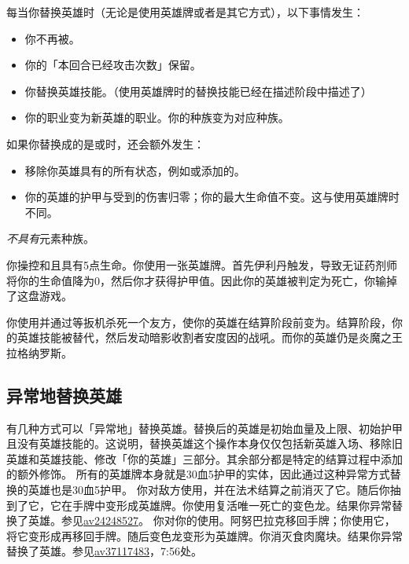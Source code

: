 每当你替换英雄时（无论是使用英雄牌或者是其它方式），以下事情发生：
\begin{itemize}
    \item 你不再被。
    \item 你的「本回合已经攻击次数」保留。
    \item 你替换英雄技能。（使用英雄牌时的替换技能已经在描述阶段中描述了）
    \item 你的职业变为新英雄的职业。你的种族变为对应种族。
\end{itemize}

如果你替换成的是或时，还会额外发生：

\begin{itemize}
    \item 移除你英雄具有的所有状态，例如或添加的。
    \item 你的英雄的护甲与受到的伤害归零；你的最大生命值不变。这与使用英雄牌时不同。
\end{itemize}

\notice {}\emph{不具有}元素种族。

\example 你操控和且具有5点生命。你使用一张英雄牌。首先伊利丹触发，导致无证药剂师将你的生命值降为0，然后你才获得护甲值。因此你的英雄被判定为死亡，你输掉了这盘游戏。

\example 你使用并通过等扳机杀死一个友方，使你的英雄在结算阶段前变为。结算阶段，你的英雄技能被替代，然后发动暗影收割者安度因的战吼。而你的英雄仍是炎魔之王拉格纳罗斯。

\subsection{异常地替换英雄}
有几种方式可以「异常地」替换英雄。替换后的英雄是初始血量及上限、初始护甲且没有英雄技能的。这说明，替换英雄这个操作本身仅仅包括新英雄入场、移除旧英雄和英雄技能、修改「你的英雄」三部分。其余部分都是特定的结算过程中添加的额外修饰。
\notice 所有的英雄牌本身就是30血5护甲的实体，因此通过这种异常方式替换的英雄也是30血5护甲。
\example {} 你对敌方使用，并在法术结算之前消灭了它。随后你抽到了它，它在手牌中变形成英雄牌。你使用复活唯一死亡的变色龙。结果你异常替换了英雄。参见\href{https://www.bilibili.com/video/av24248527}{av24248527}。
\example 你对你的使用。阿努巴拉克移回手牌；你使用它，将它变形成再移回手牌。随后变色龙变形为英雄牌。你消灭食肉魔块。结果你异常替换了英雄。参见\href{https://www.bilibili.com/video/av37117483}{av37117483}，7:56处。

